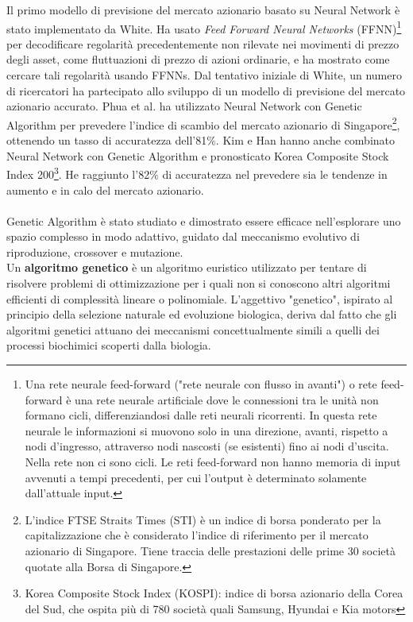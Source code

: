 \documentclass[a4paper,12pt]{report}
\begin{document}
Il primo modello di previsione del mercato azionario basato su Neural Network è stato implementato da White\cite{whitenn}. Ha usato \textit{Feed Forward Neural Networks} (FFNN)\footnote{Una rete neurale feed-forward ("rete neurale con flusso in avanti") o rete feed-forward è una rete neurale artificiale dove le connessioni tra le unità non formano cicli, differenziandosi dalle reti neurali ricorrenti. In questa rete neurale le informazioni si muovono solo in una direzione, avanti, rispetto a nodi d'ingresso, attraverso nodi nascosti (se esistenti) fino ai nodi d'uscita. Nella rete non ci sono cicli. Le reti feed-forward non hanno memoria di input avvenuti a tempi precedenti, per cui l'output è determinato solamente dall'attuale input. } per decodificare regolarità precedentemente non rilevate nei movimenti di prezzo degli asset, come fluttuazioni di prezzo di azioni ordinarie, e ha mostrato come cercare tali regolarità usando FFNNs. Dal tentativo iniziale di White, un numero di ricercatori ha partecipato allo sviluppo di un modello di previsione del mercato azionario accurato. Phua et al. \cite{puann} ha utilizzato Neural Network con Genetic Algorithm per prevedere l'indice di scambio del mercato azionario di Singapore\footnote{L'indice FTSE Straits Times (STI) è un indice di borsa ponderato per la capitalizzazione che è considerato l'indice di riferimento per il mercato azionario di Singapore. Tiene traccia delle prestazioni delle prime 30 società quotate alla Borsa di Singapore.}, ottenendo un tasso di accuratezza dell'81\%. Kim e Han \cite{kimnn} hanno anche combinato Neural Network con Genetic Algorithm e pronosticato Korea Composite Stock Index 200\footnote{Korea Composite Stock Index (KOSPI): indice di borsa azionario della Corea del Sud, che ospita più di 780 società quali Samsung, Hyundai e Kia motors}. He raggiunto l'82\% di accuratezza nel prevedere sia le tendenze in aumento e in calo del mercato azionario.\\~\\
Genetic Algorithm è stato studiato e dimostrato essere efficace nell'esplorare uno spazio complesso in modo adattivo, guidato dal meccanismo evolutivo di riproduzione, crossover e mutazione.\\
Un \textbf{algoritmo genetico} è un algoritmo euristico utilizzato per tentare di risolvere problemi di ottimizzazione per i quali non si conoscono altri algoritmi efficienti di complessità lineare o polinomiale. L'aggettivo "genetico", ispirato al principio della selezione naturale ed evoluzione biologica, deriva dal fatto che gli algoritmi genetici attuano dei meccanismi concettualmente simili a quelli dei processi biochimici scoperti dalla biologia.\\
\end{document}
